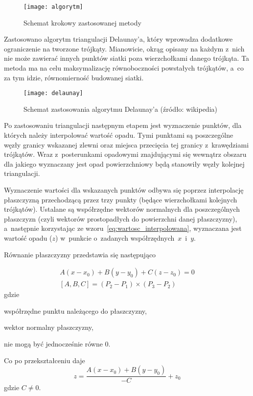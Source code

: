 \begin{figure}[!ht]
	\centering
	\texttt{[image: algorytm]}
	\caption{Schemat krokowy zastosowanej metody}
	\label{fig:algorytm}
\end{figure}

Zastosowano algorytm triangulacji Delaunay'a, który wprowadza dodatkowe ograniczenie na tworzone trójkąty. Mianowicie, okrąg opisany na każdym z~nich nie może zawierać innych punktów siatki poza wierzchołkami danego trójkąta. Ta metoda ma na celu maksymalizację równoboczności powstałych trójkątów, a~co za tym idzie, równomierność budowanej siatki.

\begin{figure}[!ht]
	\centering
	\texttt{[image: delaunay]}
	\caption{Schemat zastosowania algorytmu Delaunay'a (źródło: wikipedia)}
	\label{fig:delaunay}
\end{figure}

Po zastosowaniu triangulacji następnym etapem jest wyznaczenie punktów, dla których należy interpolować wartość opadu. Tymi punktami są poszczególne węzły granicy wskazanej zlewni oraz miejsca przecięcia tej granicy z~krawędziami trójkątów. Wraz z~posterunkami opadowymi znajdującymi się wewnątrz obszaru dla jakiego wyznaczany jest opad powierzchniowy będą stanowiły węzły kolejnej triangulacji.

Wyznaczenie wartości dla wskazanych punktów odbywa się poprzez interpolację płaszczyzną przechodzącą przez trzy punkty (będące wierzchołkami kolejnych trójkątów). Ustalane są współrzędne wektorów normalnych dla poszczególnych płaszczyzn (czyli wektorów prostopadłych do powierzchni danej płaszczyzny), a~następnie korzystając ze wzoru~\ref{eq:wartosc_interpolowana}, wyznaczana jest wartość opadu ($z$) w~punkcie o~zadanych współrzędnych~$x$~i~$y$.

Równanie płaszczyzny przedstawia się następująco

\begin{equation}
\begin{gathered}
A(x - x_0) + B(y - y_0) + C(z - z_0) = 0 \\
[A, B, C] = (P_2 - P_1) \times (P_3 - P_2)
\label{eq:rownanie_plaszczyzny}
\end{gathered}
\end{equation}
gdzie
\begin{description}[leftmargin=3cm, itemsep=0cm, labelsep=0cm]
	\item[$x_0, y_0, z_0$] współrzędne punktu należącego do płaszczyzny,
	\item[$A, B, C$] wektor normalny płaszczyzny, %
	\item[$A, B, C$] nie mogą być jednocześnie równe 0.
\end{description}
%
Co po przekształceniu daje
\begin{equation}
\label{eq:wartosc_interpolowana}
	z = \frac{A(x - x_0) + B(y - y_0)}{-C} + z_0
\end{equation}
gdzie $C \neq 0$.


